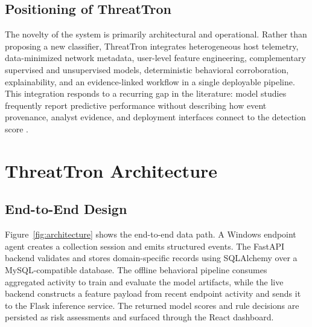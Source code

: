 \subsection{Positioning of ThreatTron}
The novelty of the system is primarily architectural and operational. Rather than proposing a new classifier, ThreatTron integrates heterogeneous host telemetry, data-minimized network metadata, user-level feature engineering, complementary supervised and unsupervised models, deterministic behavioral corroboration, explainability, and an evidence-linked workflow in a single deployable pipeline. This integration responds to a recurring gap in the literature: model studies frequently report predictive performance without describing how event provenance, analyst evidence, and deployment interfaces connect to the detection score \cite{al-mhiqani2020,alzaabi2024}.

\section{ThreatTron Architecture}
\subsection{End-to-End Design}
Figure~\ref{fig:architecture} shows the end-to-end data path. A Windows endpoint agent creates a collection session and emits structured events. The FastAPI backend validates and stores domain-specific records using SQLAlchemy over a MySQL-compatible database. The offline behavioral pipeline consumes aggregated activity to train and evaluate the model artifacts, while the live backend constructs a feature payload from recent endpoint activity and sends it to the Flask inference service. The returned model scores and rule decisions are persisted as risk assessments and surfaced through the React dashboard.


